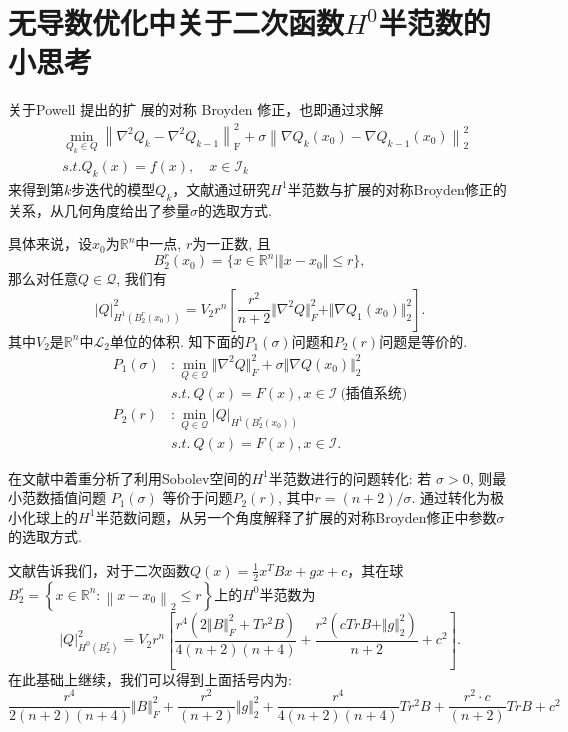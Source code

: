 \documentclass[UTF8]{ctexart}
\begin{document}
\section{无导数优化中关于二次函数$H^0$半范数的小思考}
关于Powell \cite{powell2013beyond} 提出的扩
展的对称 Broyden 修正，也即通过求解
\begin{align*}
&\min _{Q_{k} \in Q}\left\|\nabla^{2} Q_{k}-\nabla^{2} Q_{k-1}\right\|_{\mathrm{F}}^{2}+\sigma\left\|\nabla Q_{k}\left(x_{0}\right)-\nabla Q_{k-1}\left(x_{0}\right)\right\|_{2}^{2}\\
&s.t. Q_{k}(x)=f(x), \quad x \in \mathcal{I}_{k}
\end{align*}
来得到第$k$步迭代的模型$Q_k$，文献\cite{zhang2014sobolev}通过研究$H^1$半范数与扩展的对称Broyden修正的关系，从几何角度给出了参量$\sigma$的选取方式.

具体来说，设$x_{0}$为$\mathbb{R}^{n}$中一点, $r$为一正数, 且
$$B^{r}_{2}(x_{0})=\{x\in\mathbb{R}^{n}\big|\Vert x-x_{0}\Vert\leq r\},$$
那么对任意$Q\in\mathcal{Q}$, 我们有
$$|Q|^{2}_{H^{1}{(B^{r}_{2}(x_{0}))}}=V_{2}r^{n}[\frac{r^{2}}{n+2}\Vert\nabla^{2}Q\Vert^{2}_{F}+\Vert\nabla Q_{1}(x_{0})\Vert^{2}_{2}].$$
其中$V_{2}$是$\mathbb{R}^{n}$中$\mathcal{L}_{2}$单位的体积. 知下面的$P_{1}(\sigma)$问题和$P_2(r)$问题是等价的.
\begin{align*}
P_{1}(\sigma)&:\mathop{\min}\limits_{Q\in\mathcal{Q}}\Vert\nabla^{2}Q\Vert^{2}_{F}+\sigma\Vert\nabla Q(x_{0})\Vert^{2}_{2}\\
&s.t.\ Q(x)=F(x), x\in \mathcal{I}  \  \mbox{(插值系统)}\\
P_{2}(r)&:\mathop{\min}\limits_{Q\in\mathcal{Q}}\vert Q\vert_{H^{1}{(B^{r}_{2}(x_{0}))}}\\
&s.t.\ Q(x)=F(x), x\in \mathcal{I}.
\end{align*}

在文献\cite{zhang2014sobolev}中着重分析了利用Sobolev空间的$H^1$半范数进行的问题转化: 
 若 $\sigma>0$, 则最小范数插值问题 $P_1(\sigma)$ 等价于问题$P_2(r)$, 其中$r = (n + 2)/\sigma$. 通过转化为极小化球上的$H^1$半范数问题，从另一个角度解释了扩展的对称Broyden修正中参数$\sigma$的选取方式.

文献\cite{zhang2014sobolev}告诉我们，对于二次函数$Q(x)=\frac{1}{2}x^TBx+gx+c$，其在球$B^{r}_{2}=\left\{x \in \mathbb{R}^{n}: \left\|x-x_{0}\right\|_{2} \leq r\right\}$上的$H^0$半范数为
$$\vert Q\vert_{H^{0}{(B^{r}_{2})}}^{2}=V_{2}r^{n}[\frac{r^{4}(2\Vert B\Vert^{2}_{F}+Tr^2B)}{4(n+2)(n+4)}+\frac{r^{2}(cTrB+\Vert g\Vert^{2}_{2})}{n+2}+c^{2}].$$
在此基础上继续，我们可以得到上面括号内为:
$$\frac{r^{4}}{2(n+2)(n+4)}\Vert B\Vert_F^2+\frac{r^{2}}{(n+2)}\Vert g\Vert^{2}_{2}+\frac{r^{4}}{4(n+2)(n+4)}Tr^2B+\frac{r^{2}\cdot c}{(n+2)}TrB+c^{2}$$%
\end{document}
